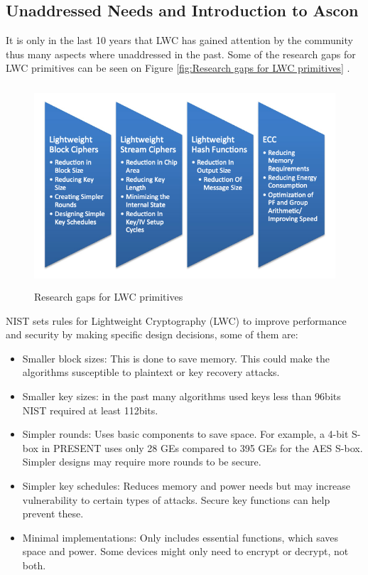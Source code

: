 \documentclass[a4paper,11pt, twoside]{article}
\begin{document}
\subsection{Unaddressed Needs and Introduction to Ascon}   %
It is only in the last 10 years that LWC has gained attention by the community thus many aspects where unaddressed in the past. Some of the research gaps for LWC primitives can be seen on Figure \ref{fig:Research gaps for LWC primitives} \cite{dhanda2020lightweight}. 


\begin{figure}[h]
    \centering
    \includegraphics[width=12cm, height=7.5cm]{media/Research_gaps.png}
    \caption{Research gaps for LWC primitives}
    \label{fig:Previews research gaps for LWC primitives}
\end{figure}

NIST sets rules for Lightweight Cryptography (LWC) to improve performance and security by making specific design decisions, some of them are:

\begin{itemize}
    \item Smaller block sizes: This is done to save memory. This could make the algorithms susceptible to plaintext or key recovery attacks.
    \item Smaller key sizes: in the past many algorithms used keys less than 96bits NIST required at least 112bits.
    \item Simpler rounds: Uses basic components to save space. For example, a 4-bit S-box in PRESENT uses only 28 GEs compared to 395 GEs for the AES S-box. Simpler designs may require more rounds to be secure.
    \item Simpler key schedules: Reduces memory and power needs but may increase vulnerability to certain types of attacks. Secure key functions can help prevent these.
    \item Minimal implementations: Only includes essential functions, which saves space and power. Some devices might only need to encrypt or decrypt, not both.
\end{itemize}
\end{document}
